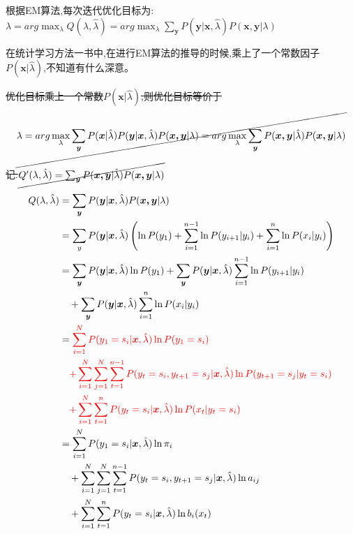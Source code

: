 \documentclass[UTF8,a4paper]{ctexart}%
\begin{document}
            根据EM算法,每次迭代优化目标为:
            $\lambda = arg \max_{\lambda} Q(\lambda , \hat{\lambda}) = arg \max_{\lambda} \sum_{\bm{y}} P(\bm{y}|\bm{x},\hat{\lambda})P(\bm{x,y}|\lambda)$

            {\color{red}
            在统计学习方法一书中,在进行EM算法的推导的时候,乘上了一个常数因子$P(\bm{x}|\hat{\lambda})$,不知道有什么深意。
            }

            \sout{优化目标乘上一个常数$P(\bm{x}|\hat{\lambda})$,则优化目标等价于}
              \[ \cancel{\lambda = arg \max_{\lambda} \sum_{\bm{y}} P(\bm{x}|\hat{\lambda})P(\bm{y}|\bm{x},\hat{\lambda})P(\bm{x,y}|\lambda) = arg \max_{\lambda} \sum_{\bm{y}} P(\bm{x,y}|\hat{\lambda})P(\bm{x,y}|\lambda)} \]

            \sout{记:}$\cancel{Q'(\lambda,\hat{\lambda}) = \sum_{\bm{y}} P(\bm{x,y}|\hat{\lambda})P(\bm{x,y}|\lambda)}$

            \begin{align}
              Q(\lambda,\hat{\lambda}) &= \sum_{\bm{y}} P(\bm{y}|\bm{x},\hat{\lambda})P(\bm{x,y}|\lambda)\\
                &= \sum_{y} P(\bm{y}|\bm{x},\hat{\lambda}) \left( \ln P(y_1) + \sum_{i = 1}^{n-1} \ln P(y_{i+1}|y_{i}) + \sum_{i = 1}^n \ln P(x_i|y_i) \right )\\
                &= \sum_{\bm{y}} P(\bm{y}|\bm{x},\hat{\lambda}) \ln P(y_1)
                  + \sum_{\bm{y}} P(\bm{y}|\bm{x},\hat{\lambda})  \sum_{i = 1}^{n-1} \ln P(y_{i+1}|y_{i})\\
                  &\quad + \sum_{\bm{y}} P(\bm{y}|\bm{x},\hat{\lambda}) \sum_{i = 1}^n \ln P(x_i|y_i) \notag \\
                &= {\color{red}
                \sum_{i = 1}^N  P(y_1 = s_i|\bm{x},\hat{\lambda}) \ln P(y_1 = s_i)}\label{eq-2017-5-1819:56:52}\\
                  &\quad{\color{red}
                  + \sum_{i = 1}^N \sum_{j = 1}^N \sum_{t = 1}^{n-1}
                       P(y_t = s_i , y_{t+1} = s_j|\bm{x},\hat{\lambda}) \ln P(y_{t+1} = s_j|y_{t} = s_i)} \notag \\
                  &\quad{\color{red}
                   + \sum_{i = 1}^N \sum_{t = 1}^n P(y_t = s_i|\bm{x},\hat{\lambda}) \ln P(x_t|y_t = s_i)} \notag \\
                &= \sum_{i = 1}^N  P(y_1 = s_i|\bm{x},\hat{\lambda}) \ln \pi_i\\
                  &\quad+ \sum_{i = 1}^N \sum_{j = 1}^N \sum_{t = 1}^{n-1}
                      P(y_t = s_i , y_{t+1} = s_j|\bm{x},\hat{\lambda}) \ln a_{ij} \notag\\
                  &\quad + \sum_{i = 1}^N \sum_{t = 1}^n P(y_t = s_i|\bm{x},\hat{\lambda}) \ln b_i(x_t) \notag
            \end{align}
\end{document}
